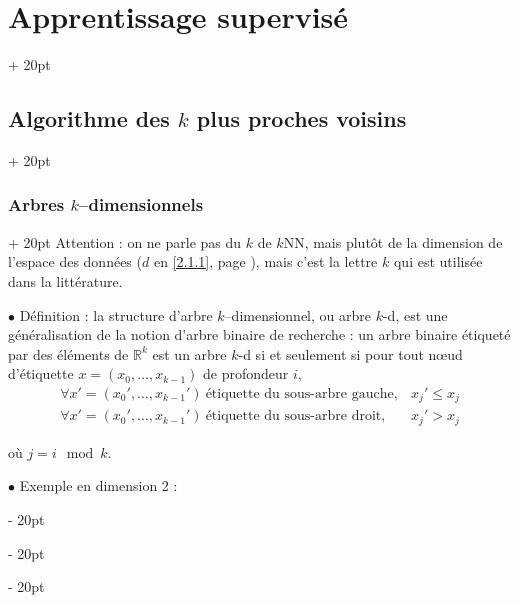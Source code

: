 \documentclass[a4paper, 12pt, twoside]{article}
\newcommand{\R}{\mathbb{R}} %
\renewcommand{\le}{\leqslant}
\newcommand{\ind}[1][20pt]{\advance\leftskip + #1}
\newcommand{\deind}[1][20pt]{\advance\leftskip - #1}
\newenvironment{indt}[2][20pt]{#2 \par \ind[#1]}{\par \deind} %
\begin{document}
\begin{indt}{\section{Apprentissage supervisé}}
\begin{indt}{\subsection{Algorithme des $k$ plus proches voisins}}
            \vspace{12pt}
            
            \begin{indt}{\subsubsection{Arbres $k$--dimensionnels}}
                Attention : on ne parle pas du $k$ de $k$NN, mais plutôt de la dimension de l'espace des données ($d$ en \ref{2.1.1}, page \pageref{2.1.1}), mais c'est la lettre $k$ qui est utilisée dans la littérature.

                \vspace{12pt}
                
                $\bullet$ Définition : la structure d'arbre $k$--dimensionnel, ou arbre $k$-d, est une généralisation de la notion d'arbre binaire de recherche : un arbre binaire étiqueté par des éléments de $\R^k$ est un arbre $k$-d si et seulement si pour tout n\oe ud d'étiquette $x = (x_0, \ldots, x_{k - 1})$ de profondeur $i$,
                \[
                    \begin{array}{ll}
                        \forall x' = (x_0', \ldots, x_{k - 1}')\ \text{étiquette du sous-arbre gauche}, & x_j' \le x_j
                        \\
                        \forall x' = (x_0', \ldots, x_{k - 1}')\ \text{étiquette du sous-arbre droit}, & x_j' > x_j
                    \end{array}
                \]

                où $j = i \mod k$.

                \vspace{12pt}
                
                $\bullet$ Exemple en dimension 2 :

                \begin{center}
\end{center}
\end{indt}
\end{indt}
\end{indt}
\end{document}
